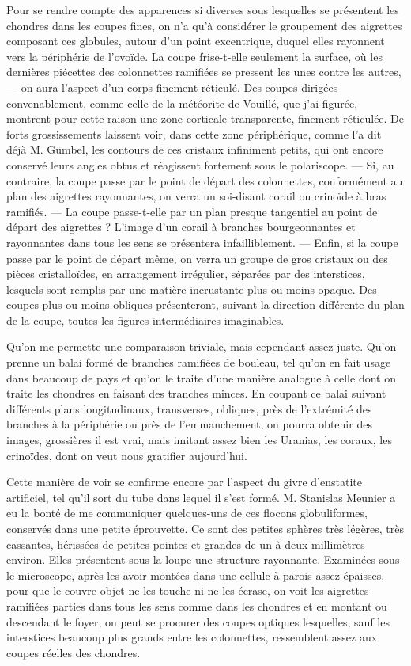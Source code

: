 \documentclass[a4paper, 12pt, oneside, french]{article}
\begin{document}
Pour se rendre compte des apparences si diverses sous lesquelles se présentent les chondres dans les coupes fines, on n'a qu'à considérer le groupement des aigrettes composant ces globules, autour d'un point excentrique, duquel elles rayonnent vers la périphérie de l'ovoïde. La coupe frise-t-elle seulement la surface, où les dernières piécettes des colonnettes ramifiées se pressent les unes contre les autres, --- on aura l'aspect d'un corps finement réticulé. Des coupes dirigées convenablement, comme celle de la météorite de Vouillé, que j'ai figurée, montrent pour cette raison une zone corticale transparente, finement réticulée. De forts grossissements laissent voir, dans cette zone périphérique, comme l'a dit déjà M. Gümbel, les contours de ces cristaux infiniment petits, qui ont encore conservé leurs angles obtus et réagissent fortement sous le polariscope. --- Si, au contraire, la coupe passe par le point de départ des colonnettes, conformément au plan des aigrettes rayonnantes, on verra un soi-disant corail ou crinoïde à bras ramifiés. --- La coupe passe-t-elle par un plan presque tangentiel au point de départ des aigrettes ? L'image d'un corail à branches bourgeonnantes et rayonnantes dans tous les sens se présentera infailliblement. --- Enfin, si la coupe passe par le point de départ même, on verra un groupe de gros cristaux ou des pièces cristalloïdes, en arrangement irrégulier, séparées par des interstices, lesquels sont remplis par une matière incrustante plus ou moins opaque. Des coupes plus ou moins obliques présenteront, suivant la direction différente du plan de la coupe, toutes les figures intermédiaires imaginables.

Qu'on me permette une comparaison triviale, mais cependant assez juste. Qu'on prenne un balai formé de branches ramifiées de bouleau, tel qu'on en fait usage dans beaucoup de pays et qu'on le traite d'une manière analogue à celle dont on traite les chondres en faisant des tranches minces. En coupant ce balai suivant différents plans longitudinaux, transverses, obliques, près de l'extrémité des branches à la périphérie ou près de l'emmanchement, on pourra obtenir des images, grossières il est vrai, mais imitant assez bien les Uranias, les coraux, les crinoïdes, dont on veut nous gratifier aujourd'hui.

Cette manière de voir se confirme encore par l'aspect du givre d'enstatite artificiel, tel qu'il sort du tube dans lequel il s'est formé. M. Stanislas Meunier a eu la bonté de me communiquer quelques-uns de ces flocons globuliformes, conservés dans une petite éprouvette. Ce sont des petites sphères très légères, très cassantes, hérissées de petites pointes et grandes de un à deux millimètres environ. Elles présentent sous la loupe une structure rayonnante. Examinées sous le microscope, après les avoir montées dans une cellule à parois assez épaisses, pour que le couvre-objet ne les touche ni ne les écrase, on voit les aigrettes ramifiées parties dans tous les sens comme dans les chondres et en montant ou descendant le foyer, on peut se procurer des coupes optiques lesquelles, sauf les interstices beaucoup plus grands entre les colonnettes, ressemblent assez aux coupes réelles des chondres.
\end{document}
